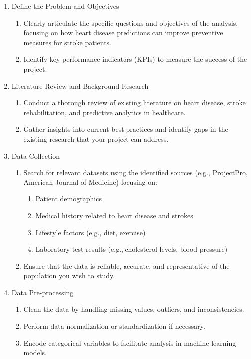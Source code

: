 \documentclass[runningheads]{llncs}
\begin{document}
\begin{enumerate}
    \item Define the Problem and Objectives
    \begin{enumerate}
        \item Clearly articulate the specific questions and objectives of the analysis, focusing on how heart disease predictions can improve preventive measures for stroke patients.
         \item Identify key performance indicators (KPIs) to measure the success of the project. 
\end{enumerate}
\item  Literature Review and Background Research
\begin{enumerate}
    \item Conduct a thorough review of existing literature on heart disease, stroke rehabilitation, and predictive analytics in healthcare. 
    \item Gather insights into current best practices and identify gaps in the existing research that your project can address. 
\end{enumerate}
\item Data Collection
\begin{enumerate}
    \item Search for relevant datasets using the identified sources (e.g., ProjectPro, American Journal of Medicine) focusing on: 
    \begin{enumerate}
        \item Patient demographics 
        \item Medical history related to heart disease and strokes 
        \item Lifestyle factors (e.g., diet, exercise) 
        \item Laboratory test results (e.g., cholesterol levels, blood pressure) 
    \end{enumerate}
    \item Ensure that the data is reliable, accurate, and representative of the population you wish to study. 
\end{enumerate}
\item Data Pre-processing
    \begin{enumerate}
        \item Clean the data by handling missing values, outliers, and inconsistencies. 
        \item Perform data normalization or standardization if necessary. 
        \item Encode categorical variables to facilitate analysis in machine learning models. 

\end{enumerate}
\end{enumerate}
\end{document}
